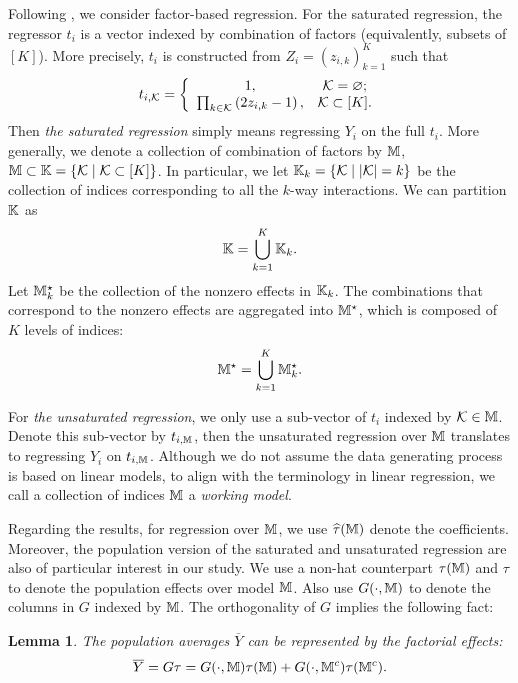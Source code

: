 \documentclass[12pt]{article}
\newtheorem{lemma}{Lemma}
\begin{document}
Following \cite{zhao2021regression}, we consider factor-based regression. For the saturated regression, the regressor ${t}_i$ is a vector indexed by combination of factors (equivalently, subsets of $[K]$). More precisely, ${t}_i$ is constructed from ${Z}_i = (z_{i,k})_{k=1}^K$ such that 
\begin{align*}
    {t}_{i,\mathcal{K}} = \left\{
    \begin{array}{cc}
        1, & {\mathcal{K}} = \varnothing; \\
        \prod_{k\in\mathcal{K}}\left(2z_{i,k}-1\right), & {\mathcal{K}}\subset [K].  
    \end{array}
    \right.
\end{align*}
Then \textit{the saturated regression} simply means regressing $Y_i$ on the full ${t}_i$. More generally, we denote a collection of combination of factors by ${\mathbb{M}}$, ${\mathbb{M}} \subset \mathbb{K} = \{\mathcal{K}\mid \mathcal{K}\subset[K]\}$. In particular, we let ${\mathbb{K}}_k = \{{\mathcal{K}}\mid |{\mathcal{K}}| = k\}$ be the collection of indices corresponding to all the $k$-way interactions. We can partition ${\mathbb{K}}$ as
\begin{align*}
    {\mathbb{K}} = \bigcup_{k=1}^K {\mathbb{K}}_k.
\end{align*}
Let ${\mathbb{M}}_k^\star$ be the collection of the nonzero effects in ${\mathbb{K}}_k$. The combinations that correspond to the nonzero effects are aggregated into ${\mathbb{M}}^\star$, which is composed of $K$ levels of indices:
\begin{align*}
{\mathbb{M}}^\star = \bigcup_{k=1}^{K} {\mathbb{M}}_k^\star.
\end{align*}

For \textit{the unsaturated regression}, we only use a sub-vector of ${t}_i$ indexed by $\mathcal{K}\in{\mathbb{M}}$. Denote this sub-vector by ${t}_{i,{\mathbb{M}}}$, then the unsaturated regression over ${\mathbb{M}}$ translates to regressing $Y_i$ on ${t}_{i,{\mathbb{M}}}$. Although we do not assume the data generating process is based on linear models, to align with the terminology in linear regression, we call a collection of indices ${\mathbb{M}}$ a \textit{working model}.

Regarding the results, for regression over ${\mathbb{M}}$,  we use $\widehat{\tau}({\mathbb{M}})$ denote the coefficients.   Moreover, the population version of the saturated and unsaturated regression are also of particular interest in our study. We use a non-hat counterpart ${\tau}({\mathbb{M}}) $ and $\tau$ to denote the population effects over model ${\mathbb{M}}$. Also use $G(\cdot,{\mathbb{M}})$ to denote the columns in $G$ indexed by ${\mathbb{M}}$.  The orthogonality of $G$ implies the following fact:
\begin{lemma}
The population averages $\overline{Y}$ can be represented by the factorial effects:
\begin{align}\label{eqn:reparametrization}
    \overline{Y} = G\tau = G(\cdot, {\mathbb{M}})\tau({\mathbb{M}}) + G(\cdot, {\mathbb{M}}^c)\tau({\mathbb{M}}^c).
\end{align}
\end{lemma}
\end{document}
